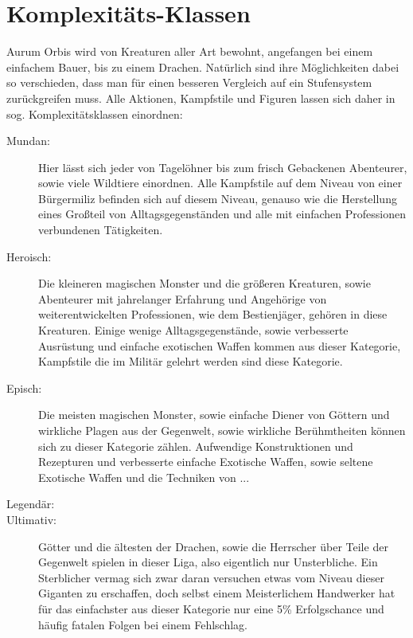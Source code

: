 \documentclass[a4paper,12pt,oneside]{book}
\begin{document}
\chapter{Komplexitäts-Klassen}
Aurum Orbis wird von Kreaturen aller Art bewohnt, angefangen bei einem einfachem Bauer, bis zu einem Drachen. Natürlich sind ihre Möglichkeiten dabei so verschieden, dass man für einen besseren Vergleich auf ein Stufensystem zurückgreifen muss. Alle Aktionen, Kampfstile und Figuren lassen sich daher in sog. Komplexitätsklassen einordnen:
\begin{description}
\item[Mundan:] Hier lässt sich jeder von Tagelöhner bis zum frisch Gebackenen Abenteurer, sowie viele Wildtiere einordnen. Alle Kampfstile auf dem Niveau von einer Bürgermiliz befinden sich auf diesem Niveau, genauso wie die Herstellung eines Großteil von Alltagsgegenständen und alle mit einfachen Professionen verbundenen Tätigkeiten.
\item[Heroisch:] Die kleineren magischen Monster und die größeren Kreaturen, sowie Abenteurer mit jahrelanger Erfahrung und Angehörige von weiterentwickelten Professionen, wie dem Bestienjäger, gehören in diese Kreaturen. Einige wenige Alltagsgegenstände, sowie verbesserte Ausrüstung und einfache exotischen Waffen kommen aus dieser Kategorie, Kampfstile die im Militär gelehrt werden sind diese Kategorie.
\item[Episch:]Die meisten magischen Monster, sowie einfache Diener von Göttern und wirkliche Plagen aus der Gegenwelt, sowie wirkliche Berühmtheiten können sich zu dieser Kategorie zählen. Aufwendige Konstruktionen und Rezepturen und verbesserte einfache Exotische Waffen, sowie seltene Exotische Waffen und die Techniken von ...
\item[Legendär:]
\item[Ultimativ:]Götter und die ältesten der Drachen, sowie die Herrscher über Teile der Gegenwelt spielen in dieser Liga, also eigentlich nur Unsterbliche. Ein Sterblicher vermag sich zwar daran versuchen etwas vom Niveau dieser Giganten zu erschaffen, doch selbst einem Meisterlichem Handwerker hat für das einfachster aus dieser Kategorie nur eine 5\% Erfolgschance und häufig fatalen Folgen bei einem Fehlschlag.
\end{description}
\end{document}
